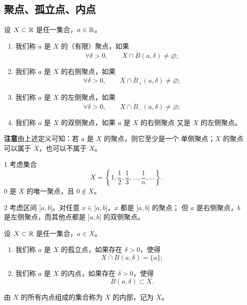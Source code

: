 \subsection{聚点、孤立点、内点}
	\label{sec:2-5-4}

\begin{mydef*}{}
设 \(X\subset\mathbb{R}\) 是任一集合，\(a\in\mathbb{R}\)。
\begin{enumerate}[label=\arabic*)]
  \item 我们称 \(a\) 是 \(X\) 的（有限）聚点，如果
  \[
  \forall\delta>0,\qquad X\cap\mathring B(a,\delta)\neq\varnothing;
  \]
  \item 我们称 \(a\) 是 \(X\) 的右侧聚点，如果
  \[
  \forall\delta>0,\qquad X\cap\mathring B_+(a,\delta)\neq\varnothing;
  \]
  \item 我们称 \(a\) 是 \(X\) 的左侧聚点，如果
  \[
  \forall\delta>0,\qquad X\cap\mathring B_-(a,\delta)\neq\varnothing;
  \]
  \item 我们称 \(a\) 是 \(X\) 的双侧聚点，如果 \(a\) 是 \(X\) 的右侧聚点
  又是 \(X\) 的左侧聚点。
\end{enumerate}
\end{mydef*}

\textbf{注意}\quad 由上述定义可知：若 \(a\) 是 \(X\) 的聚点，则它至少是一个
单侧聚点；\(X\) 的聚点可以属于 \(X\)，也可以不属于 \(X\)。

\begin{sourceexample}{1}
考虑集合
\[
X=\left\{1,\frac12,\frac13,\ldots,\frac1n,\ldots\right\}.
\]
\(0\) 是 \(X\) 的唯一聚点，且 \(0\notin X\)。
\end{sourceexample}

\begin{sourceexample}{2}
考虑区间 \(]a,b]\)。对任意 \(x\in]a,b]\)，\(x\) 都是 \(]a,b]\) 的聚点；
但 \(a\) 是右侧聚点，\(b\) 是左侧聚点，而其他点都是 \(]a,b]\) 的双侧聚点。
\end{sourceexample}

\begin{mydef*}{}
设 \(X\subset\mathbb{R}\) 是任一集合，\(a\in X\)。
\begin{enumerate}[label=\arabic*)]
  \item 我们称 \(a\) 是 \(X\) 的孤立点，如果存在 \(\delta>0\)，使得
  \[
  X\cap B(a,\delta)=\{a\};
  \]
  \item 我们称 \(a\) 是 \(X\) 的内点，如果存在 \(\delta>0\)，使得
  \[
  B(a,\delta)\subset X.
  \]
\end{enumerate}
由 \(X\) 的所有内点组成的集合称为 \(X\) 的内部，记为 \(\mathring X\)。
\end{mydef*}

